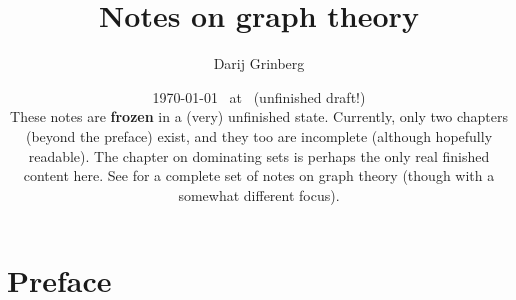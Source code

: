 \documentclass[numbers=enddot,12pt,final,onecolumn,notitlepage]{scrartcl}%
\theoremstyle{definition}
\begin{document}
\title{Notes on graph theory}
\author{Darij Grinberg}
\date{
\today\ 
at \DTMcurrenttime\ 
(unfinished draft!)\\\vspace{1pc}
These notes are \textbf{frozen} in a (very) unfinished state.
Currently, only two chapters (beyond the preface) exist, and
they too are incomplete (although hopefully readable).
The chapter on dominating sets is perhaps the only real
finished content here.
See \cite{22s} for a complete set of notes on graph theory
(though with a somewhat different focus).
}
\maketitle
\tableofcontents

\doclicenseThis

\section{Preface}
\end{document}
